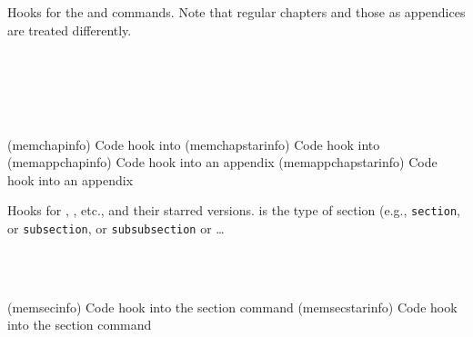 Hooks for the \cmd{\chapter} and \cmd{\chapter*} commands. Note
that regular chapters and those as appendices are treated 
differently.
\begin{syntax}
\cmd{\memchapinfo} \\
\cmd{\memchapstarinfo} \\
\cmd{\memappchapinfo} \\
\cmd{\memappchapstarinfo} \\
\end{syntax}
\glossary(memchapinfo)%
  {}%
  {Code hook into }%
\glossary(memchapstarinfo)%
  {}%
  {Code hook into }%
\glossary(memappchapinfo)%
  {}%
  {Code hook into an appendix }%
\glossary(memappchapstarinfo)%
  {}%
  {Code hook into an appendix }%

Hooks for \cmd{\section}, \cmd{\subsection}, etc., and their
starred versions.  is the type of section (e.g.,
\texttt{section}, or \texttt{subsection}, or 
\texttt{subsubsection} or \ldots
\begin{syntax}
\cmd{\memsecinfo} \\
\cmd{\memsecstarinfo} \\
\end{syntax}
\glossary(memsecinfo)%
  {}%
  {Code hook into the  section command}%
\glossary(memsecstarinfo)%
  {}%
  {Code hook into the  section command}%

